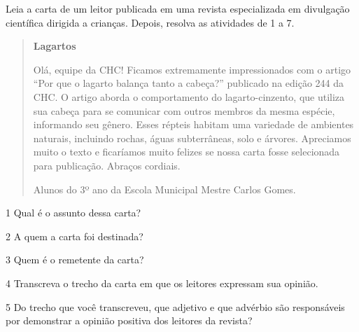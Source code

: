 
Leia a carta de um leitor publicada em uma revista especializada em
divulgação científica dirigida a crianças. Depois, resolva as atividades de 1 a 7.

\begin{quote}
\textbf{Lagartos}

Olá, equipe da CHC! Ficamos extremamente impressionados com o artigo ``Por que o lagarto balança tanto a cabeça?'' publicado na edição 244 da CHC. O artigo aborda o comportamento do lagarto-cinzento, que utiliza sua cabeça para se comunicar com outros membros da mesma espécie, informando seu gênero. Esses répteis habitam uma variedade de ambientes naturais, incluindo rochas, águas subterrâneas, solo e árvores. Apreciamos muito o texto e ficaríamos muito felizes se nossa carta fosse selecionada para publicação. Abraços cordiais.

Alunos do 3º ano da Escola Municipal Mestre Carlos Gomes.

\end{quote}

\num{1} Qual é o assunto dessa carta?


\num{2} A quem a carta foi destinada?


\num{3} Quem é o remetente da carta?


\num{4} Transcreva o trecho da carta em que os leitores expressam sua opinião.


\num{5} Do trecho que você transcreveu, que adjetivo e que advérbio são responsáveis por demonstrar a opinião positiva dos leitores da revista?


